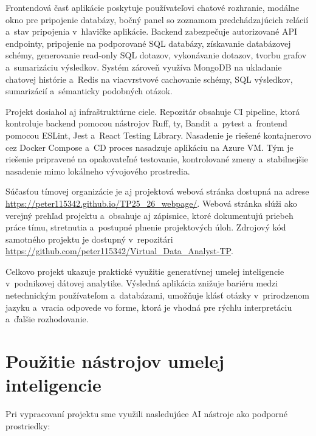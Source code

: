 \documentclass[a4paper, 12pt]{article}
\begin{document}
Frontendová časť aplikácie poskytuje používateľovi chatové rozhranie, modálne okno pre pripojenie databázy, bočný panel so zoznamom predchádzajúcich relácií a~stav pripojenia v~hlavičke aplikácie. Backend zabezpečuje autorizované API endpointy, pripojenie na podporované SQL databázy, získavanie databázovej schémy, generovanie read-only SQL dotazov, vykonávanie dotazov, tvorbu grafov a~sumarizáciu výsledkov. Systém zároveň využíva MongoDB na ukladanie chatovej histórie a~Redis na viacvrstvové cachovanie schémy, SQL výsledkov, sumarizácií a~sémanticky podobných otázok.

Projekt dosiahol aj infraštruktúrne ciele. Repozitár obsahuje CI pipeline, ktorá kontroluje backend pomocou nástrojov Ruff, ty, Bandit a~pytest a~frontend pomocou ESLint, Jest a~React Testing Library. Nasadenie je riešené kontajnerovo cez Docker Compose a~CD proces nasadzuje aplikáciu na Azure VM. Tým je riešenie pripravené na opakovateľné testovanie, kontrolované zmeny a~stabilnejšie nasadenie mimo lokálneho vývojového prostredia.

Súčasťou tímovej organizácie je aj projektová webová stránka dostupná na adrese \url{https://peter115342.github.io/TP25_26_webpage/}. Webová stránka slúži ako verejný prehľad projektu a~obsahuje aj zápisnice, ktoré dokumentujú priebeh práce tímu, stretnutia a~postupné plnenie projektových úloh. Zdrojový kód samotného projektu je dostupný v~repozitári \url{https://github.com/peter115342/Virtual_Data_Analyst-TP}.

Celkovo projekt ukazuje praktické využitie generatívnej umelej inteligencie v~podnikovej dátovej analytike. Výsledná aplikácia znižuje bariéru medzi netechnickým používateľom a~databázami, umožňuje klásť otázky v~prirodzenom jazyku a~vracia odpovede vo forme, ktorá je vhodná pre rýchlu interpretáciu a~ďalšie rozhodovanie.

\clearpage
\section*{Použitie nástrojov umelej inteligencie}

Pri vypracovaní projektu sme využili nasledujúce AI nástroje ako podporné prostriedky:
\end{document}
